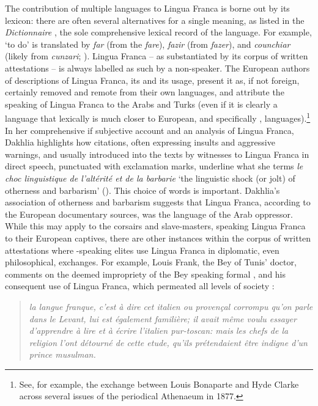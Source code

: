 \documentclass[output=paper]{langsci/langscibook}
\begin{document}
	The contribution of multiple languages to Lingua Franca is borne out by its lexicon: there are often several alternatives for a single meaning, as listed in the \textit{Dictionnaire} \citep{Anonymous1830}, the sole comprehensive lexical record of the language. For example, ‘to do’ is translated by \textit{far} (from the  \textit{fare}), \textit{fazir} (from  \textit{fazer}), and \textit{counchiar} (likely from  \textit{cunzari}; \citealt[316]{Cifoletti2004}). Lingua Franca – as substantiated by its corpus of written attestations – is always labelled as such by a non-speaker. The European authors of descriptions of Lingua Franca, its  and its usage, present it as, if not foreign, certainly removed and remote from their own languages, and attribute the speaking of Lingua Franca to the Arabs and Turks (even if it is clearly a language that lexically is much closer to European, and specifically , languages).\footnote{See, for example, the exchange between Louis Bonaparte and Hyde Clarke across several issues of the periodical Athenaeum in 1877.} In her comprehensive if subjective account and an  analysis of Lingua Franca, Dakhlia highlights how citations, often expressing insults and aggressive warnings, and usually introduced into the texts by witnesses to Lingua Franca in direct speech, punctuated with exclamation marks, underline what she terms \textit{le choc linguistique de l’altérité et de la barbarie} ‘the linguistic shock (or jolt) of otherness and barbarism’ (\citealt[351]{Dakhlia2008}). This choice of words is important. Dakhlia’s association of otherness and barbarism suggests that Lingua Franca, according to the European documentary sources, was the language of the Arab oppressor. While this may apply to the corsairs and slave-masters, speaking Lingua Franca to their European captives, there are other instances within the corpus of written attestations where -speaking elites use Lingua Franca in diplomatic, even philosophical, exchanges. For example, Louis Frank, the Bey of Tunis’ doctor, comments on the deemed impropriety of the Bey speaking formal , and his consequent use of Lingua Franca, which permeated all levels of society \citep[70]{Frank1850}:
	
	\begin{quote}
		\textit{la langue franque, c’est à dire cet italien ou provençal corrompu qu’on parle dans le Levant, lui est également familière; il avait même voulu essayer d’ap\-prendre à lire et à écrire l’italien pur-toscan: mais les chefs de la religion l’ont détourné de cette etude, qu’ils prétendaient être indigne d’un prince musulman.}
	\end{quote}
	
\end{document}
